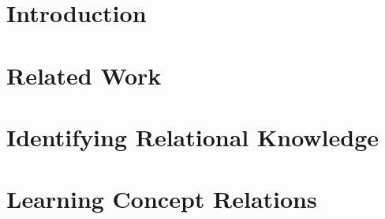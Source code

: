 \documentclass{www2010-submission}
\begin{document}



\maketitle
\begin{abstract}

\end{abstract}




\newcommand{\ignore}[1]{}

\section{Introduction}
\label{sec:introduction}


\section{Related Work}
\label{sec:previous-work}


\section{Identifying Relational Knowledge}
\label{sec:ident-relat-knowl}


\section{Learning Concept Relations}
\label{sec:super-approach}

\end{document}
